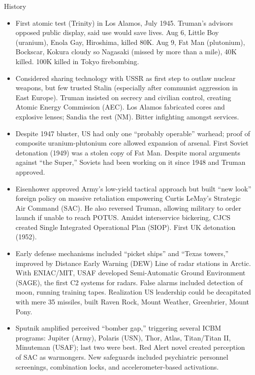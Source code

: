 \documentclass[
]{article}
\begin{document}
History

\begin{itemize}
\item
  First atomic test (Trinity) in Los Alamos, July 1945. Truman's
  advisors opposed public display, said use would save lives. Aug 6,
  Little Boy (uranium), Enola Gay, Hiroshima, killed 80K. Aug 9, Fat Man
  (plutonium), Bockscar, Kokura cloudy so Nagasaki (missed by more than
  a mile), 40K killed. 100K killed in Tokyo firebombing.
\item
  Considered sharing technology with USSR as first step to outlaw
  nuclear weapons, but few trusted Stalin (especially after communist
  aggression in East Europe). Truman insisted on secrecy and civilian
  control, creating Atomic Energy Commission (AEC). Los Alamos
  fabricated cores and explosive lenses; Sandia the rest (NM). Bitter
  infighting amongst services.
\item
  Despite 1947 bluster, US had only one ``probably operable'' warhead;
  proof of composite uranium-plutonium core allowed expansion of
  arsenal. First Soviet detonation (1949) was a stolen copy of Fat Man.
  Despite moral arguments against ``the Super,'' Soviets had been
  working on it since 1948 and Truman approved.
\item
  Eisenhower approved Army's low-yield tactical approach but built ``new
  look'' foreign policy on massive retaliation empowering Curtis LeMay's
  Strategic Air Command (SAC). He also reversed Truman, allowing
  military to order launch if unable to reach POTUS. Amidst interservice
  bickering, CJCS created Single Integrated Operational Plan (SIOP).
  First UK detonation (1952).
\item
  Early defense mechanisms included ``picket ships'' and ``Texas
  towers,'' improved by Distance Early Warning (DEW) Line of radar
  stations in Arctic. With ENIAC/MIT, USAF developed Semi-Automatic
  Ground Environment (SAGE), the first C2 systems for radars. False
  alarms included detection of moon, running training tapes. Realization
  US leadership could be decapitated with mere 35 missiles, built Raven
  Rock, Mount Weather, Greenbrier, Mount Pony.
\item
  Sputnik amplified perceived ``bomber gap,'' triggering several ICBM
  programs: Jupiter (Army), Polaris (USN), Thor, Atlas, Titan/Titan II,
  Minuteman (USAF); last two were best. Red Alert novel created
  perception of SAC as warmongers. New safeguards included psychiatric
  personnel screenings, combination locks, and accelerometer-based
  activations.

\end{itemize}
\end{document}
